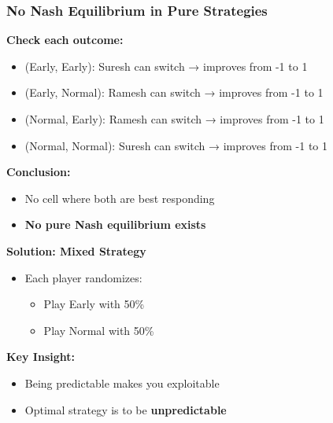 \begin{frame}[fragile]\frametitle{No Nash Equilibrium in Pure Strategies}

\textbf{Check each outcome:}

\begin{itemize}
  \item (Early, Early): Suresh can switch → improves from -1 to 1
  \item (Early, Normal): Ramesh can switch → improves from -1 to 1
  \item (Normal, Early): Ramesh can switch → improves from -1 to 1
  \item (Normal, Normal): Suresh can switch → improves from -1 to 1
\end{itemize}

\vspace{6pt}

\textbf{Conclusion:}
\begin{itemize}
  \item No cell where both are best responding
  \item \textbf{No pure Nash equilibrium exists}
\end{itemize}

\vspace{8pt}

\textbf{Solution: Mixed Strategy}

\begin{itemize}
  \item Each player randomizes:
  \begin{itemize}
    \item Play Early with 50\%
    \item Play Normal with 50\%
  \end{itemize}
\end{itemize}

\vspace{6pt}

\textbf{Key Insight:}
\begin{itemize}
  \item Being predictable makes you exploitable
  \item Optimal strategy is to be \textbf{unpredictable}
\end{itemize}

\end{frame}


